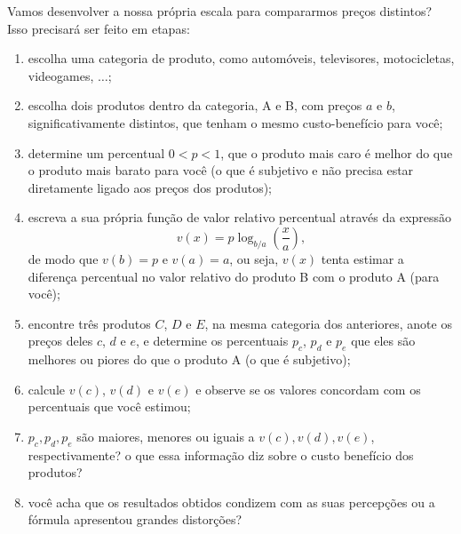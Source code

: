 \documentclass[10 pt,usenames,dvipsnames, oneside]{article}
\begin{document}
Vamos desenvolver a nossa própria escala para compararmos preços distintos? Isso precisará ser feito em etapas:
\begin{enumerate}
\item escolha uma categoria de produto, como automóveis, televisores, motocicletas, videogames, $\ldots$;
\item escolha dois produtos dentro da categoria, A e B, com preços $a$ e $b$, significativamente distintos, que tenham o mesmo custo-benefício para você;
\item determine um percentual $0 < p <1$, que o produto mais caro é melhor do que o produto mais barato para você (o que é subjetivo e não precisa estar diretamente ligado aos preços dos produtos);
\item escreva a sua própria função de valor relativo percentual através da expressão
$$
v(x)=p\log_{b/a} \left( \frac{x}{a} \right),
$$
de modo que $v(b) = p$ e $v(a)=a$, ou seja, $v(x)$ tenta estimar a diferença percentual no valor relativo do produto B com o produto A (para você);
\item encontre três produtos $C$, $D$ e $E$, na mesma categoria dos anteriores, anote os preços deles $c$, $d$ e $e$, e determine os percentuais $p_c$, $p_d$ e $p_e$ que eles são melhores ou piores do que o produto A (o que é subjetivo);
\item calcule $v(c)$, $v(d)$ e $v(e)$ e observe se os valores concordam com os percentuais que você estimou;
\item  $p_c, p_d, p_e$ são maiores, menores ou iguais a $v(c), v(d), v(e)$, respectivamente? o que essa informação diz sobre o custo benefício dos produtos?  
\item você acha que os resultados obtidos condizem com as suas percepções ou a fórmula apresentou grandes distorções?
\end{enumerate}
\end{document}
